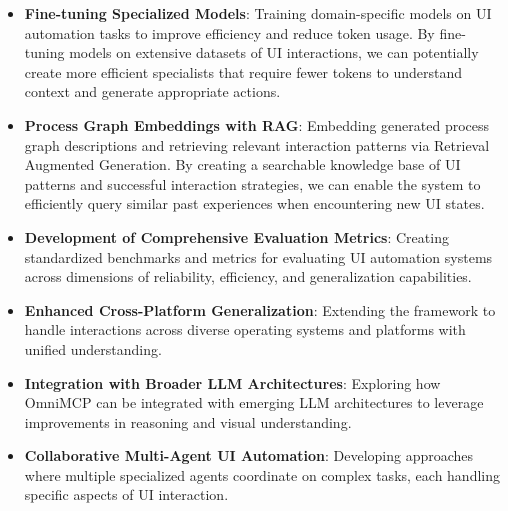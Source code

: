 \documentclass{article}
\begin{document}
\begin{itemize}
    \item \textbf{Fine-tuning Specialized Models}: Training domain-specific models on UI automation tasks to improve efficiency and reduce token usage. By fine-tuning models on extensive datasets of UI interactions, we can potentially create more efficient specialists that require fewer tokens to understand context and generate appropriate actions.
    
    \item \textbf{Process Graph Embeddings with RAG}: Embedding generated process graph descriptions and retrieving relevant interaction patterns via Retrieval Augmented Generation. By creating a searchable knowledge base of UI patterns and successful interaction strategies, we can enable the system to efficiently query similar past experiences when encountering new UI states.
    
    \item \textbf{Development of Comprehensive Evaluation Metrics}: Creating standardized benchmarks and metrics for evaluating UI automation systems across dimensions of reliability, efficiency, and generalization capabilities.
    
    \item \textbf{Enhanced Cross-Platform Generalization}: Extending the framework to handle interactions across diverse operating systems and platforms with unified understanding.
    
    \item \textbf{Integration with Broader LLM Architectures}: Exploring how OmniMCP can be integrated with emerging LLM architectures to leverage improvements in reasoning and visual understanding.
    
    \item \textbf{Collaborative Multi-Agent UI Automation}: Developing approaches where multiple specialized agents coordinate on complex tasks, each handling specific aspects of UI interaction.
\end{itemize}
\end{document}
